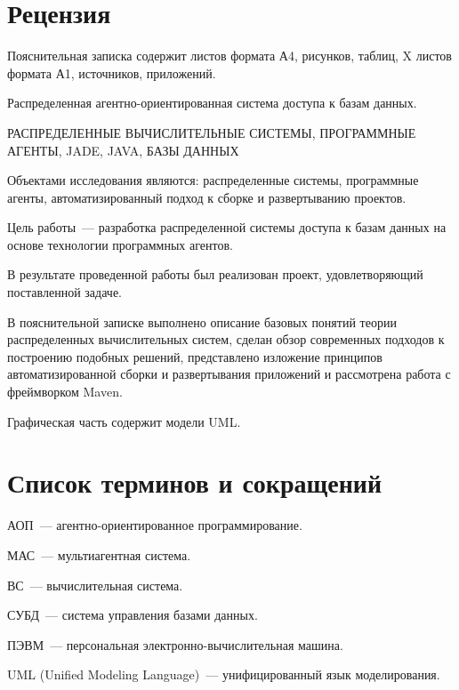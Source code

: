 \section*{Рецензия}
Пояснительная записка содержит  листов формата А4,  рисунков,  таблиц, X листов формата А1,  источников,  приложений.

Распределенная агентно-ориентированная система доступа к базам данных.

РАСПРЕДЕЛЕННЫЕ ВЫЧИСЛИТЕЛЬНЫЕ СИСТЕМЫ, ПРОГРАММНЫЕ АГЕНТЫ, JADE, JAVA, БАЗЫ ДАННЫХ

Объектами исследования являются: распределенные системы, программные агенты, автоматизированный подход к сборке и развертыванию проектов.

Цель работы~--- разработка распределенной системы доступа к базам данных на основе технологии программных агентов.

В результате проведенной работы был реализован проект, удовлетворяющий поставленной задаче.

В пояснительной записке выполнено описание базовых понятий теории распределенных вычислительных систем, сделан обзор современных подходов к построению подобных решений,  представлено изложение принципов  автоматизированной сборки и развертывания приложений и рассмотрена работа с фреймворком Maven.

Графическая часть содержит модели UML.

\newpage
\section*{Список терминов и сокращений}
АОП~--- агентно-ориентированное программирование.

МАС~--- мультиагентная система.
 
ВС~--- вычислительная система.

СУБД~--- система управления базами данных.

ПЭВМ~--- персональная электронно-вычислительная машина.

UML (Unified Modeling Language)~--- унифицированный язык моделирования.
